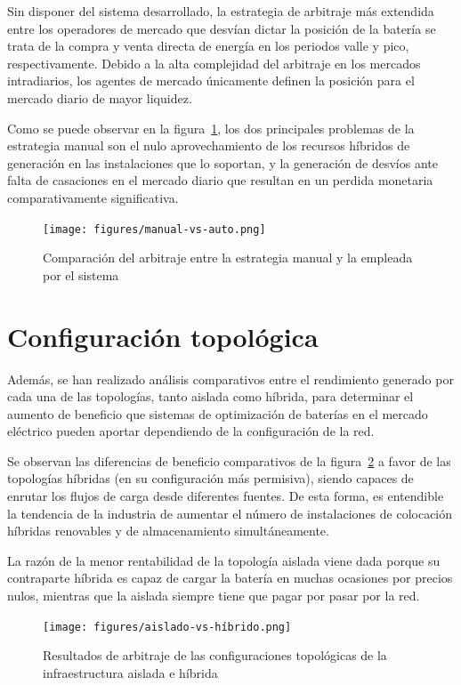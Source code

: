 Sin disponer del sistema desarrollado, la estrategia de arbitraje más extendida entre los operadores de mercado que desvían dictar la posición de la batería se trata de la compra y venta directa de energía en los periodos valle y pico, respectivamente. Debido a la alta complejidad del arbitraje en los mercados intradiarios, los agentes de mercado únicamente definen la posición para el mercado diario de mayor liquidez.

Como se puede observar en la figura~\ref{fig:manual-vs-auto}, los dos principales problemas de la estrategia manual son el nulo aprovechamiento de los recursos híbridos de generación en las instalaciones que lo soportan, y la generación de desvíos ante falta de casaciones en el mercado diario que resultan en un perdida monetaria comparativamente significativa.

\begin{figure}
\centering
\texttt{[image: figures/manual-vs-auto.png]}
\caption{Comparación del arbitraje entre la estrategia manual y la empleada por el sistema}
\label{fig:manual-vs-auto}
\end{figure}

\section{Configuración topológica}
\label{makereference7.3}

Además, se han realizado análisis comparativos entre el rendimiento generado por cada una de las topologías, tanto aislada como híbrida, para determinar el aumento de beneficio que sistemas de optimización de baterías en el mercado eléctrico pueden aportar dependiendo de la configuración de la red.

Se observan las diferencias de beneficio comparativos de la figura~\ref{fig:aislado-vs-híbrido} a favor de las topologías híbridas (en su configuración más permisiva), siendo capaces de enrutar los flujos de carga desde diferentes fuentes. De esta forma, es entendible la tendencia de la industria de aumentar el número de instalaciones de colocación híbridas renovables y de almacenamiento simultáneamente.

La razón de la menor rentabilidad de la topología aislada viene dada porque su contraparte híbrida es capaz de cargar la batería en muchas ocasiones por precios nulos, mientras que la aislada siempre tiene que pagar por pasar por la red.

\begin{figure}
\centering
\texttt{[image: figures/aislado-vs-híbrido.png]}
\caption{Resultados de arbitraje de las configuraciones topológicas de la infraestructura aislada e híbrida}
\label{fig:aislado-vs-híbrido}
\end{figure}

